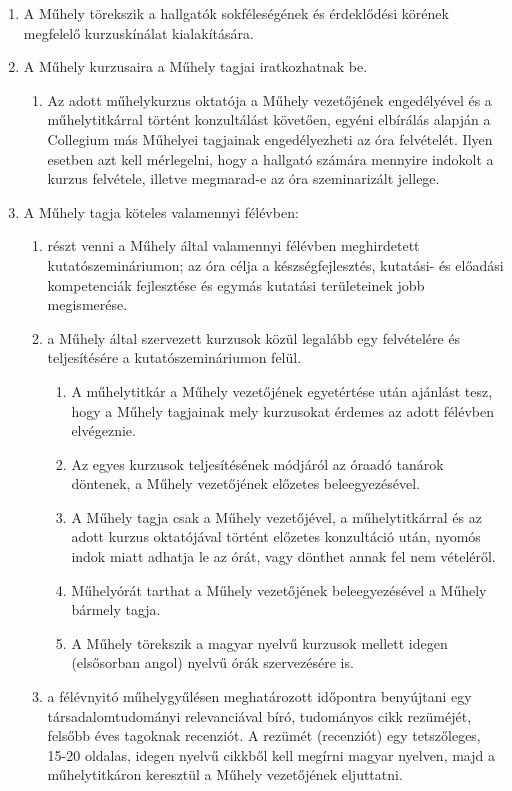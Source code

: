 \documentclass{rulebook}
\begin{document}
\begin{enumerate}
	\item A Műhely törekszik a hallgatók sokféleségének és érdeklődési körének megfelelő
	kurzuskínálat kialakítására.
	\item A Műhely kurzusaira a Műhely tagjai iratkozhatnak be.
	\begin{enumerate}
		\item Az adott műhelykurzus oktatója a Műhely vezetőjének engedélyével és a műhelytitkárral történt konzultálást követően, egyéni elbírálás alapján a Collegium más Műhelyei tagjainak engedélyezheti az óra felvételét. Ilyen esetben azt kell mérlegelni, hogy a hallgató számára mennyire indokolt a kurzus felvétele, illetve megmarad-e az óra szeminarizált jellege.
	\end{enumerate}
	\item A Műhely tagja köteles valamennyi félévben:
	\begin{enumerate}
		\item részt venni a Műhely által valamennyi félévben meghirdetett kutatószemináriumon; az óra célja a készségfejlesztés, kutatási- és előadási kompetenciák fejlesztése és egymás kutatási területeinek jobb megismerése.
		\item a Műhely által szervezett kurzusok közül legalább egy felvételére és teljesítésére a kutatószemináriumon felül.
		\begin{enumerate}
			\item A műhelytitkár a Műhely vezetőjének egyetértése után ajánlást tesz, hogy a Műhely tagjainak mely kurzusokat érdemes az adott félévben elvégeznie.
			\item Az egyes kurzusok teljesítésének módjáról az óraadó tanárok döntenek, a Műhely vezetőjének előzetes beleegyezésével.
			\item A Műhely tagja csak a Műhely vezetőjével, a műhelytitkárral és az adott kurzus oktatójával történt előzetes konzultáció után, nyomós indok miatt adhatja le az órát, vagy dönthet annak fel nem vételéről.
			\item Műhelyórát tarthat a Műhely vezetőjének beleegyezésével a Műhely bármely tagja.
			\item A Műhely törekszik a magyar nyelvű kurzusok mellett idegen (elsősorban angol) nyelvű órák szervezésére is.
		\end{enumerate}
		\item a félévnyitó műhelygyűlésen meghatározott időpontra benyújtani egy társadalomtudományi relevanciával bíró, tudományos cikk rezüméjét, felsőbb éves tagoknak recenziót. A rezümét (recenziót) egy tetszőleges, 15-20 oldalas, idegen nyelvű cikkből kell megírni magyar nyelven, majd a műhelytitkáron keresztül a Műhely vezetőjének eljuttatni.

\end{enumerate}
\end{enumerate}
\end{document}
